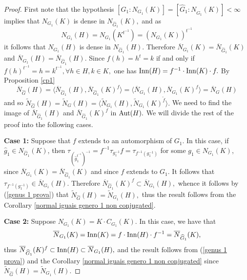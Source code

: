 \documentclass[a4paper,12pt]{article}
\def\aut {{\rm Aut}}
\def\inn {{\rm Inn}}
\begin{document}
{%

\begin{proof}
First note that the hypothesis $[G_1:N_{G_1}(K)]=[\widehat G_1:N_{\widehat G_1}(K)]<\infty$ implies that $N_{G_1}(K)$ is dense in $N_{\widehat G_1}(K),$ and as $$N_{G_1}(H)=N_{G_1}(K^{t^{-1}})=\left(N_{G_1}(K)\right)^{t^{-1}}$$ it follows that $N_{G_1}(H)$ is dense in $N_{\widehat G_1}(H)$. Therefore  $\overline N_{G_1}(K) = \overline N_{\widehat G_1}(K)$ and $\overline N_{G_1}(H) = \overline N_{\widehat G_1}(H).$ Since $f(h)=h^t=k$ if and only if $f(h)^{t^{-1}}=h=k^{t^{-1}}, \forall h \in H, k \in K,$ one has $\inn(H)=f^{-1} \cdot \inn(K) \cdot f.$  By Proposition \ref{cp1} \begin{equation} \label{genus 1 prova}  \overline{N}_{\widehat G}(H) = \langle \overline{N}_{\widehat G_1}(H), \overline{N}_{\widehat G_1}(K)^{f} \rangle=\langle \overline{N}_{G_1}(H), \overline{N}_{G_1}(K)^{f} \rangle=\overline{N}_{G}(H)\end{equation} and so   $\widetilde{N}_{\widehat G}(H) = \widetilde{N}_{G}(H)=\langle  \widetilde{N}_{G_1}(H),  \widetilde{N}_{G_1}(K)^{\tilde f}\rangle.$ We need to find the image of $\overline{N}_{\widehat G_1}(H)$ and $\overline{N}_{\widehat G_1}(K)^{f}$ in $\aut(H).$ We will divide the rest of the proof into the following cases.

\textbf{Case 1:} Suppose that $f$ extends to an automorphism of $G_1.$ In this case, if $\hat{g}_1 \in N_{\widehat G_1}(K)$,  then $\tau_{\left( \hat{g}_1^{t^{-1}}\right)^{-1}}= f^{-1} \tau_{g_1^{-1}}f=\tau_{f^{-1}(g_1^{-1})}$ for some $g_1 \in N_{G_1}(K)$, since $\overline N_{G_1}(K) = \overline N_{\widehat G_1}(K)$ and since $f$ extends to $G_1$. It follows that $\tau_{f^{-1}(g_1^{-1})} \in \overline{N}_{G_1}(H).$ Therefore $\overline{N}_{\widehat G_1}(K)^{f} \subset \overline{N}_{G_1}(H),$ whence it follows by (\ref{genus 1 prova}) that $\widetilde{N}_{\widehat G}(H)=\widetilde{N}_{G_1}(H),$ thus the result follows from the Corollary \ref{normal iguais genero 1 non conjugated}. 

\textbf{Case 2:} Suppose $N_{G_1}(K)=K \cdot C_{G_1}(K).$ In this case, we have that $$\overline{N}_{G_1}(K)=\inn(K)=f\cdot \inn(H) \cdot f^{-1}=\overline{N}_{\widehat G_1}(K),$$  thus $\overline{N}_{\widehat G_1}(K)^{f} \subset \inn(H) \subset \overline{N}_{G_1}(H),$ and the result follows from (\ref{genus 1 prova}) and the Corollary \ref{normal iguais genero 1 non conjugated} since $\widetilde{N}_{\widehat G}(H)=\widetilde{N}_{G_1}(H).$ 


\end{proof}}
\end{document}
